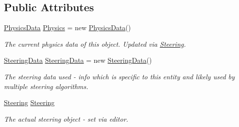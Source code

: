 \subsection*{Public Attributes}
\begin{DoxyCompactItemize}
\item 
\hyperlink{class_skyrates_1_1_common_1_1_a_i_1_1_physics_data}{Physics\-Data} \hyperlink{class_skyrates_1_1_common_1_1_entity_1_1_entity_dynamic_a2cc825f563606d4d565a4b0de1feab19}{Physics} = new \hyperlink{class_skyrates_1_1_common_1_1_a_i_1_1_physics_data}{Physics\-Data}()
\begin{DoxyCompactList}\small\item\em The current physics data of this object. Updated via \hyperlink{class_skyrates_1_1_common_1_1_entity_1_1_entity_dynamic_a8d35984946a298623b4de895873de43b}{Steering}. \end{DoxyCompactList}\item 
\hyperlink{class_skyrates_1_1_common_1_1_a_i_1_1_steering_data}{Steering\-Data} \hyperlink{class_skyrates_1_1_common_1_1_entity_1_1_entity_dynamic_a60e4edbed3f02c3ba4a7c6150fbad90e}{Steering\-Data} = new \hyperlink{class_skyrates_1_1_common_1_1_a_i_1_1_steering_data}{Steering\-Data}()
\begin{DoxyCompactList}\small\item\em The steering data used -\/ info which is specific to this entity and likely used by multiple steering algorithms. \end{DoxyCompactList}\item 
\hyperlink{class_skyrates_1_1_common_1_1_a_i_1_1_steering}{Steering} \hyperlink{class_skyrates_1_1_common_1_1_entity_1_1_entity_dynamic_a8d35984946a298623b4de895873de43b}{Steering}
\begin{DoxyCompactList}\small\item\em The actual steering object -\/ set via editor. \end{DoxyCompactList}\end{DoxyCompactItemize}
